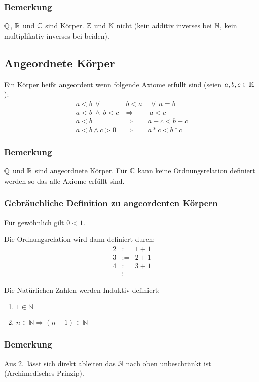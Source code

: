 \subsubsection{Bemerkung}
$\mathbb{Q}$, $\mathbb{R}$ und $\mathbb{C}$ sind Körper.
$\mathbb{Z}$ und $\mathbb{N}$ nicht (kein additiv inverses bei $\mathbb{N}$,
kein multiplikativ inverses bei beiden).


\subsection{Angeordnete Körper}
Ein Körper heißt angeordent wenn folgende Axiome erfüllt sind
(seien $a,b,c \in \mathbb{K}$):
\begin{eqnarray*}
    a<b\ \vee\ &b<a&\ \vee\ a=b\\
    a<b\ \wedge\ b<c\ &\Rightarrow&\ a<c\\
    a<b &\Rightarrow& a+c<b+c\\
    a<b \wedge c>0 &\Rightarrow& a*c<b*c
\end{eqnarray*}
\subsubsection{Bemerkung}
$\mathbb{Q}$ und $\mathbb{R}$ sind angeordnete Körper. Für $\mathbb{C}$
kann keine Ordnungsrelation definiert werden so das alle Axiome erfüllt
sind.

\subsubsection{Gebräuchliche Definition zu angeordenten Körpern}
Für gewöhnlich gilt $0<1$.

 Die Ordnungsrelation wird dann definiert durch:
\begin{eqnarray*}
    2&:=& 1+1 \\
    3&:=& 2+1 \\
    4&:=&3+1 \\
    &\vdots&
\end{eqnarray*}

 Die Natürlichen Zahlen werden Induktiv definiert:
\begin{enumerate}
    \item $1 \in \mathbb{N}$
    \item $n \in \mathbb{N} \Rightarrow (n+1)\in\mathbb{N}$
\end{enumerate}

\subsubsection{Bemerkung}
Aus 2.\ lässt sich direkt ableiten das $\mathbb{N}$ nach oben unbeschränkt ist (Archimedisches Prinzip).

